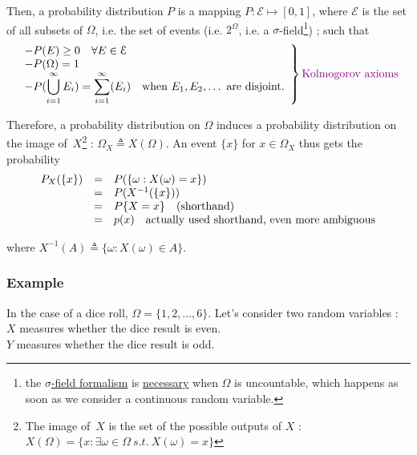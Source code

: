 \documentclass[12pt]{report}
\newcommand{\defobj}[1]{\color{red}#1\color{black}{}}
\newcommand{\defmean}[1]{\color{green!70!black}#1\color{black}{}}
\renewcommand{\emph}[1]{\color{violet}#1\color{black}{}}
\newcommand{\sigmaField}{\mathcal{E}}
\begin{document}
Then, a \defobj{probability distribution} $P$ is a \defmean{mapping $P: \sigmaField\mapsto[0,1]$}, 
where $\sigmaField$ is the set of all subsets of $\Omega$, i.e. the set of \emph{events} (i.e. $2^{\Omega}$,
i.e. a $\sigma$-field\footnote{the \href{https://en.wikipedia.org/wiki/Sigma-algebra}{$\sigma$-field formalism} is \href{http://math.stackexchange.com/a/683941/44171}{necessary} when $\Omega$ is uncountable, which happens as soon as we consider a continuous random variable.}) ;
such that
\defmean{
  \begin{displaymath}
    \left.
  \begin{array}{ll}
    - P(E) \ge 0 \quad \forall E \in \sigmaField\\
    - P(\Omega) = 1\\
    - P(\displaystyle\bigcup_{i=1}^{\infty} E_{i}) = \sum_{i=1}^{\infty}(E_{i}) \quad \text{when $E_1, E_2, \dots$ are disjoint.}
    \end{array}
  \right\} \emph{\text{Kolmogorov axioms}}
  \end{displaymath}
}

Therefore, a probability distribution on $\Omega$ induces a probability
distribution on the image of~$X$\footnote{The image of~$X$ is the set of the
  possible outputs of $X$ : $X(\Omega) = \{x : \exists \omega\in\Omega\ s.t.\ 
  X(\omega) = x\}$} : $\Omega_{X} \triangleq X(\Omega)$. An event
$\{x\}$ for $x \in \Omega_X$ thus gets the probability
\begin{equation*}
\begin{array}{r l l}
  P_X(\{x\}) & = & P(\{\omega : X(\omega) = x\})\\
  & = & P(X^{-1}(\{x\}))\\
  & = & P\{X=x\} \quad \text{(shorthand)}\\
  & = & p(x) \quad \text{actually used shorthand, even more ambiguous}
\end{array}
\end{equation*}

where $X^{-1}(A) \triangleq \{\omega : X(\omega)\in A\}$.

\subsubsection{Example}
In the case of a dice roll, $\Omega = \{1, 2, \dots, 6\}$. Let's consider two
random variables :\\
$X$ measures whether the dice result is even.\\
$Y$ measures whether the dice result is odd.
\end{document}
